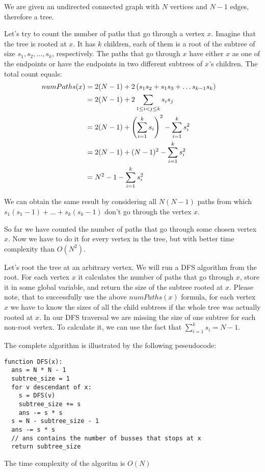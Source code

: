 
We are given an undirected connected graph with $N$ vertices and $N - 1$ edges,
therefore a tree.

Let's try to count the number of paths that go through a vertex $x$.
Imagine that the tree is rooted at $x$. It has $k$ children, each of them is
a root of the subtree of size $s_1, s_2, \dots, s_k$, respectively.
The paths that go through $x$ have either $x$ as one of the endpoints or have
the endpoints in two different subtrees of $x$'s children.
The total count equals:
\begin{align*}
numPaths(x) &= 2(N - 1) + 2\left(s_1s_2 + s_1s_3 + \dots s_{k - 1}s_k\right) \cr
            &= 2(N - 1) + 2\sum_{1\le i < j \le k} s_i s_j \cr
            &= 2(N - 1) + \left(\sum_{i = 1}^k s_i\right)^2 - \sum_{i = 1}^k s_i^2 \cr
            &= 2(N - 1) + (N - 1)^2 - \sum_{i = 1}^k s_i^2 \cr
            &= N^2 - 1 - \sum_{i = 1}^k s_i^2 \cr
\end{align*}

We can obtain the same result by considering all $N(N - 1)$ paths from which
$s_1(s_1 - 1) + \dots + s_k(s_k - 1)$ don't go through the vertex $x$.

So far we have counted the number of paths that go through some chosen vertex $x$.
Now we have to do it for every vertex in the tree, but with better time complexity than $O(N^2)$.

Let's root the tree at an arbitrary vertex. We will run a DFS algorithm from the root.
For each vertex $x$ it calculates the number of paths that go through $x$, store it
in some global variable, and return the size of the subtree rooted at $x$.
Please note, that to successfully use the above $numPaths(x)$ formula, for each
vertex $x$ we have to know the sizes of all the child subtrees if the whole tree
was actually rooted at $x$. In our DFS traversal we are missing the size of one
subtree for each non-root vertex. To calculate it, we can use the fact that
$\sum_{i=1}^k s_i = N - 1$.

The complete algorithm is illustrated by the following peseudocode:

\begin{lstlisting}
function DFS(x):
  ans = N * N - 1
  subtree_size = 1
  for v descendant of x:
    s = DFS(v)
    subtree_size += s
    ans -= s * s
  s = N - subtree_size - 1
  ans -= s * s
  // ans contains the number of busses that stops at x
  return subtree_size
\end{lstlisting}

The time complexity of the algoritm is $O(N)$
